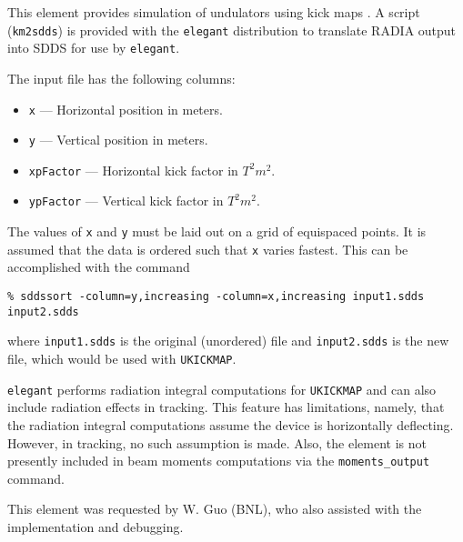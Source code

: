 This element provides simulation of undulators using kick maps \cite{Elleaume1992}.
A script (\verb|km2sdds|) is provided with the {\tt elegant}
distribution to translate RADIA \cite{radia} output into SDDS for use by
\verb|elegant|.

The input file has the following columns:
\begin{itemize}
\item \verb|x| --- Horizontal position in meters.
\item \verb|y| --- Vertical position in meters.
\item \verb|xpFactor| --- Horizontal kick factor in $T^2 m^2$.
\item \verb|ypFactor| --- Vertical kick factor in $T^2 m^2$.
\end{itemize}
The values of \verb|x| and \verb|y| must be laid out on a grid of equispaced points.
It is assumed that the data is ordered such that \verb|x| varies fastest.  This can be
accomplished with the command
\begin{verbatim}
% sddssort -column=y,increasing -column=x,increasing input1.sdds input2.sdds
\end{verbatim}
where \verb|input1.sdds| is the original (unordered) file and \verb|input2.sdds| is the
new file, which would be used with \verb|UKICKMAP|.

{\tt elegant} performs radiation integral computations for \verb|UKICKMAP| and can
also include radiation effects in tracking.  This feature has limitations, namely, that
the radiation integral computations assume the device is horizontally deflecting.  However,
in tracking, no such assumption is made.  Also, the element is not presently included
in beam moments computations via the \verb|moments_output| command.

This element was requested by W. Guo (BNL), who also assisted with the
implementation and debugging.
